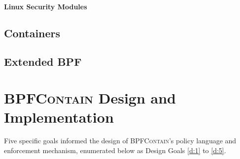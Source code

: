 \documentclass[dvipsnames, 12pt]{article}
\def\bpfcontain{\textsc{BPFContain}}
\begin{document}
\paragraph*{Linux Security Modules}

\subsection{Containers}
\label{subsection:containers}


\subsection{Extended BPF}


\section{\bpfcontain{} Design and Implementation}
\label{sec:design}

Five specific goals informed the design of \bpfcontain{}'s policy language and
enforcement mechanism, enumerated below as Design Goals \ref{d:1} to \ref{d:5}.
\end{document}
